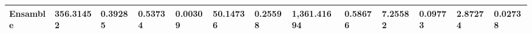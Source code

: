 \begin{table}[]
\begin{tabular}{@{}|l|r|r|r|r|r|r|r|r|l|l|l|l|@{}}
Ensamble                                     & \multicolumn{1}{l|}{\textbf{356.31452}} & \multicolumn{1}{l|}{\textbf{0.39285}} & \multicolumn{1}{l|}{0.53734} & \multicolumn{1}{l|}{\textbf{0.00309}} & \multicolumn{1}{l|}{\textbf{50.14736}} & \multicolumn{1}{l|}{0.25598} & \multicolumn{1}{l|}{\textbf{1,361.41694}} & \multicolumn{1}{l|}{0.58676} & 7.25582          & 0.09773          & 2.87274          & 0.02738          \\ \bottomrule
\end{tabular}
\end{table}